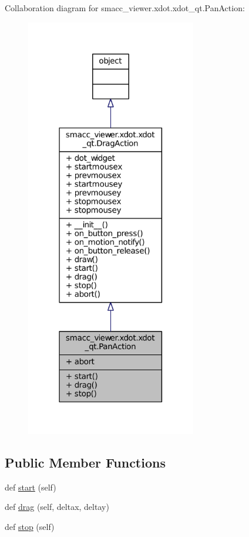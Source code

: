 Collaboration diagram for smacc\+\_\+viewer.\+xdot.\+xdot\+\_\+qt.\+Pan\+Action\+:
\nopagebreak
\begin{figure}[H]
\begin{center}
\leavevmode
\includegraphics[width=211pt]{classsmacc__viewer_1_1xdot_1_1xdot__qt_1_1PanAction__coll__graph}
\end{center}
\end{figure}
\subsection*{Public Member Functions}
\begin{DoxyCompactItemize}
\item 
def \hyperlink{classsmacc__viewer_1_1xdot_1_1xdot__qt_1_1PanAction_a7ba53215f3f58b93416dad49a1736817}{start} (self)
\item 
def \hyperlink{classsmacc__viewer_1_1xdot_1_1xdot__qt_1_1PanAction_a43a1b53e53dd55e7a88ec1fc95ff297d}{drag} (self, deltax, deltay)
\item 
def \hyperlink{classsmacc__viewer_1_1xdot_1_1xdot__qt_1_1PanAction_adb2e94bf4ffbf40091c207c009596f31}{stop} (self)
\end{DoxyCompactItemize}
